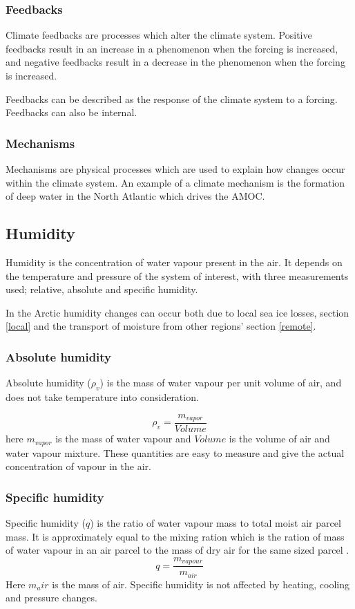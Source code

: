 \documentclass[12pt, oneside]{article}
\begin{document}
\subsubsection{Feedbacks}
Climate feedbacks are processes which alter the climate system. Positive feedbacks result in an increase in a phenomenon when the forcing is increased, and negative feedbacks result in a decrease in the phenomenon when the forcing is increased. 

Feedbacks can be described as the response of the climate system to a forcing. Feedbacks can also be internal. 

\subsubsection{Mechanisms}
Mechanisms are physical processes which are used to explain how changes occur within the climate system. An example of a climate mechanism is the formation of deep water in the North Atlantic which drives the AMOC.

\subsection{Humidity}\label{humidity}

Humidity is the concentration of water vapour present in the air. It depends on the temperature and pressure of the system of interest, with three measurements used; relative, absolute and specific humidity. 

In the Arctic humidity changes can occur both due to local sea ice losses, section \ref{local} and the transport of moisture from other regions' section \ref{remote}. 


\subsubsection{Absolute humidity}
Absolute humidity ($\rho_v$) is the mass of water vapour per unit volume of air, and does not take temperature into consideration\cite[p.~91]{stull2015practical}.

\begin{equation}
    \rho_v = \frac{m_{vapor}}{Volume}
\end{equation}
here $m_{vapor}$ is the mass of water vapour and $Volume$ is the volume of air and water vapour mixture. These quantities are easy to measure and give the actual concentration of vapour in the air. 



\subsubsection{Specific humidity}
Specific humidity ($q$) is the ratio of water vapour mass to total moist air parcel mass. It is approximately equal to the mixing ration which is the ration of mass of water vapour in an air parcel to the mass of dry air for the same sized parcel \cite[p.~91]{stull2015practical}. 
\begin{equation}
    q = \frac{m_{vapour}}{m_{air}}
\end{equation}
Here $m_air$ is the mass of air. Specific humidity is not affected by heating, cooling and pressure changes. 
\end{document}

